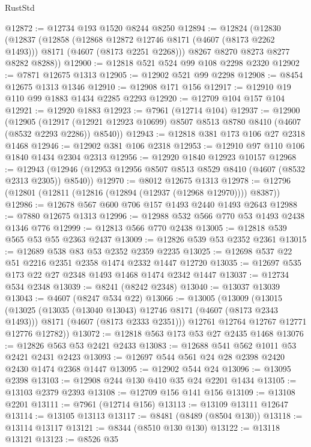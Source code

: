 \begin{lexlean}{RustStd}
\begin{coremodule}
@12872 := @12734 @193 @1520 @8244 @8250
@12894 := @12824
    (@12830
      (@12837
        (@12858
          (@12868 @12872 @12746 @8171 (@4607 (@8173 @2262 @1493)))
          @8171
          (@4607 (@8173 @2251 @2268)))
        @8267
        @8270
        @8273
        @8277
        @8282
        @8288))
@12900 := @12818 @521 @524 @99 @108 @2298 @2320
@12902 := @7871 @12675 @1313
@12905 := @12902 @521 @99 @2298
@12908 := @8454 @12675 @1313 @1346
@12910 := @12908 @171 @156
@12917 := @12910 @19 @110 @99 @1883 @1434 @2285 @2293
@12920 := @12709 @104 @157 @104
@12921 := @12920 @1883
@12923 := @7961 (@12714 @104)
@12937 := @12900
    (@12905
      (@12917 (@12921 @12923 @10699) @8507 @8513 @8780 @8410 (@4607 (@8532 @2293 @2286)) @8540))
@12943 := @12818 @381 @173 @106 @27 @2318 @1468
@12946 := @12902 @381 @106 @2318
@12953 := @12910 @97 @110 @106 @1840 @1434 @2304 @2313
@12956 := @12920 @1840 @12923 @10157
@12968 := @12943 (@12946 (@12953 @12956 @8507 @8513 @8529 @8410 (@4607 (@8532 @2313 @2305)) @8540))
@12970 := @8012 @12675 @1313
@12978 := @12796 (@12801 (@12811 (@12816 (@12894 (@12937 (@12968 @12970)))) @8387))
@12986 := @12678 @567 @600 @706 @157 @1493 @2440 @1493 @2643
@12988 := @7880 @12675 @1313
@12996 := @12988 @532 @566 @770 @53 @1493 @2438 @1346 @776
@12999 := @12813 @566 @770 @2438
@13005 := @12818 @539 @565 @53 @55 @2363 @2437
@13009 := @12826 @539 @53 @2352 @2361
@13015 := @12689 @538 @83 @53 @2352 @2359 @2235
@13025 := @12698 @537 @22 @51 @2216 @2351 @2358 @1474 @2332 @1447 @12720
@13035 := @12697 @535 @173 @22 @27 @2348 @1493 @1468 @1474 @2342 @1447
@13037 := @12734 @534 @2348
@13039 := @8241 (@8242 @2348)
@13040 := @13037 @13039
@13043 := @4607 (@8247 @534 @22)
@13066 := @13005
    (@13009
      (@13015
        (@13025
          (@13035 (@13040 @13043) @12746 @8171 (@4607 (@8173 @2343 @1493)))
          @8171
          (@4607 (@8173 @2333 @2351)))
        @12761
        @12764
        @12767
        @12771
        @12776
        @12782))
@13072 := @12818 @563 @173 @53 @27 @2435 @1468
@13076 := @12826 @563 @53 @2421 @2433
@13083 := @12688 @541 @562 @1011 @53 @2421 @2431 @2423
@13093 := @12697 @544 @561 @24 @28 @2398 @2420 @2430 @1474 @2368 @1447
@13095 := @12902 @544 @24
@13096 := @13095 @2398
@13103 := @12908 @244 @130 @410 @35 @24 @2201 @1434
@13105 := @13103 @2379 @2393
@13108 := @12709 @156 @141 @156
@13109 := @13108 @2201
@13111 := @7961 (@12714 @156)
@13113 := @13109 @13111 @12647
@13114 := @13105 @13113
@13117 := @8481 (@8489 (@8504 @130))
@13118 := @13114 @13117
@13121 := @8344 (@8510 @130 @130)
@13122 := @13118 @13121
@13123 := @8526 @35

\end{coremodule}
\end{lexlean}

